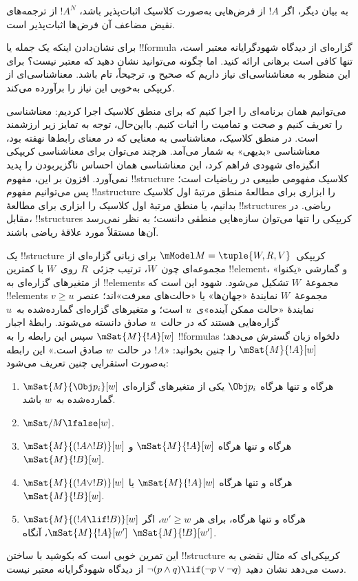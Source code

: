 \documentclass[../../../include/open-logic-section]{subfiles}
\begin{document}
به بیان دیگر، اگر $!A$ از فرض‌هایی به‌صورت کلاسیک اثبات‌پذیر باشد،
$!A^N$ از ترجمه‌های نقیض مضاعف آن فرض‌ها اثبات‌پذیر است.

برای نشان‌دادن اینکه یک جمله یا !!{formula} گزاره‌ای از دیدگاه
شهودگرایانه معتبر است، تنها کافی است برهانی ارائه کنید. اما چگونه
می‌توانید نشان دهید که معتبر نیست؟ برای این منظور به معناشناسی‌ای نیاز
داریم که صحیح و، ترجیحاً، تام باشد. معناشناسی‌ای از کریپکی به‌خوبی این
نیاز را برآورده می‌کند.

می‌توانیم همان برنامه‌ای را اجرا کنیم که برای منطق کلاسیک اجرا کردیم:
معناشناسی را تعریف کنیم و صحت و تمامیت را اثبات کنیم. بااین‌حال، توجه
به تمایز زیر ارزشمند است. در منطق کلاسیک، معناشناسی به معنایی که در
معنای رابط‌ها نهفته بود، معناشناسی «بدیهی» به شمار می‌آمد. هرچند
می‌توان برای معناشناسی کریپکی انگیزه‌ای شهودی فراهم کرد، این معناشناسی
همان احساس ناگزیربودن را پدید نمی‌آورد. افزون بر این، مفهوم
!!{structure} کلاسیک مفهومی طبیعی در ریاضیات است؛ پس می‌توانیم مفهوم
!!a{structure} را ابزاری برای مطالعهٔ منطق مرتبهٔ اول کلاسیک بدانیم، یا
منطق مرتبهٔ اول کلاسیک را ابزاری برای مطالعهٔ !!{structure}s ریاضی.
در مقابل، !!{structure}s کریپکی را تنها می‌توان سازه‌هایی منطقی دانست؛
به نظر نمی‌رسد آن‌ها مستقلاً مورد علاقهٔ ریاضی باشند.

یک !!{structure} کریپکی~$\mModel M = \tuple{W, R, V}$ برای زبانی
گزاره‌ای از مجموعه‌ای چون~$W$، ترتیب جزئی~$R$ روی~$W$ با کمترین
!!{element}، و گمارشی «یکنوا» از متغیرهای گزاره‌ای به !!{element}s
مجموعهٔ~$W$ تشکیل می‌شود. شهود این است که !!{element}s مجموعهٔ~$W$
نمایندهٔ «جهان‌ها» یا «حالت‌های معرفت»اند؛ عنصر $v \geq u$ نمایندهٔ
«حالت ممکن آینده»ی~$u$ است؛ و متغیرهای گزاره‌ای گمارده‌شده به~$u$
گزاره‌هایی هستند که در حالت~$u$ صادق دانسته می‌شوند. رابطهٔ اجبار
$\mSat{M}{!A}[w]$ سپس این رابطه را به !!{formula}s دلخواه زبان گسترش
می‌دهد؛ $\mSat{M}{!A}[w]$ را چنین بخوانید: «$!A$ در حالت~$w$ صادق
است.» این رابطه به‌صورت استقرایی چنین تعریف می‌شود:
\begin{enumerate}
\item $\mSat{M}{\Obj p_i}[w]$ هرگاه و تنها هرگاه $\Obj p_i$ یکی از
  متغیرهای گزاره‌ای گمارده‌شده به~$w$ باشد.
\item $\mSat/{M}{\lfalse}[w]$.
\item $\mSat{M}{(!A \land !B)}[w]$ هرگاه و تنها هرگاه
  $\mSat{M}{!A}[w]$ و $\mSat{M}{!B}[w]$.
\item $\mSat{M}{(!A \lor !B)}[w]$ هرگاه و تنها هرگاه
  $\mSat{M}{!A}[w]$ یا $\mSat{M}{!B}[w]$.
\item $\mSat{M}{(!A \lif !B)}[w]$ هرگاه و تنها هرگاه، برای هر
  $w' \geq w$، اگر $\mSat{M}{!A}[w']$، آنگاه $\mSat{M}{!B}[w']$.
\end{enumerate}
این تمرین خوبی است که بکوشید با ساختن !!{structure} کریپکی‌ای که مثال
نقضی به دست می‌دهد نشان دهید $\lnot (p \land q) \lif
(\lnot p \lor \lnot q)$ از دیدگاه شهودگرایانه معتبر نیست.
\end{document}
